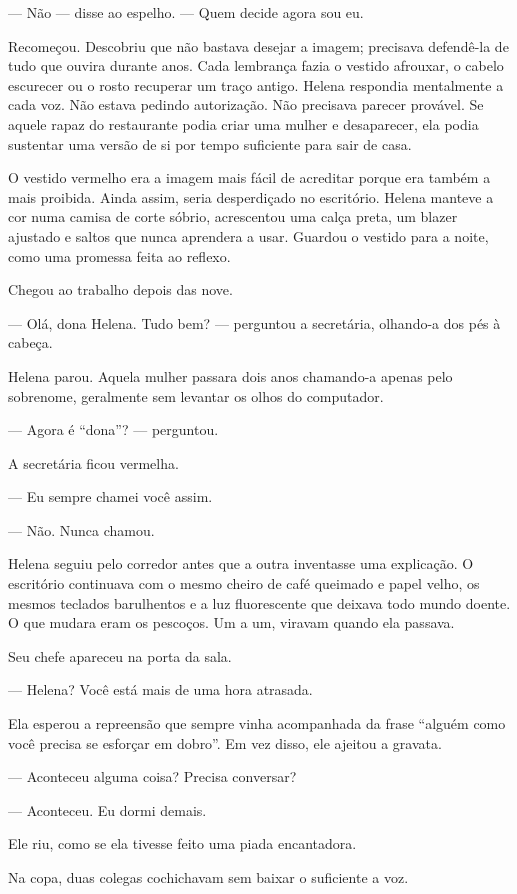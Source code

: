 — Não — disse ao espelho. — Quem decide agora sou eu.

Recomeçou. Descobriu que não bastava desejar a imagem; precisava defendê-la de tudo que ouvira durante anos. Cada lembrança fazia o vestido afrouxar, o cabelo escurecer ou o rosto recuperar um traço antigo. Helena respondia mentalmente a cada voz. Não estava pedindo autorização. Não precisava parecer provável. Se aquele rapaz do restaurante podia criar uma mulher e desaparecer, ela podia sustentar uma versão de si por tempo suficiente para sair de casa.

O vestido vermelho era a imagem mais fácil de acreditar porque era também a mais proibida. Ainda assim, seria desperdiçado no escritório. Helena manteve a cor numa camisa de corte sóbrio, acrescentou uma calça preta, um blazer ajustado e saltos que nunca aprendera a usar. Guardou o vestido para a noite, como uma promessa feita ao reflexo.

Chegou ao trabalho depois das nove.

— Olá, dona Helena. Tudo bem? — perguntou a secretária, olhando-a dos pés à cabeça.

Helena parou. Aquela mulher passara dois anos chamando-a apenas pelo sobrenome, geralmente sem levantar os olhos do computador.

— Agora é “dona”? — perguntou.

A secretária ficou vermelha.

— Eu sempre chamei você assim.

— Não. Nunca chamou.

Helena seguiu pelo corredor antes que a outra inventasse uma explicação. O escritório continuava com o mesmo cheiro de café queimado e papel velho, os mesmos teclados barulhentos e a luz fluorescente que deixava todo mundo doente. O que mudara eram os pescoços. Um a um, viravam quando ela passava.

Seu chefe apareceu na porta da sala.

— Helena? Você está mais de uma hora atrasada.

Ela esperou a repreensão que sempre vinha acompanhada da frase “alguém como você precisa se esforçar em dobro”. Em vez disso, ele ajeitou a gravata.

— Aconteceu alguma coisa? Precisa conversar?

— Aconteceu. Eu dormi demais.

Ele riu, como se ela tivesse feito uma piada encantadora.

Na copa, duas colegas cochichavam sem baixar o suficiente a voz.

